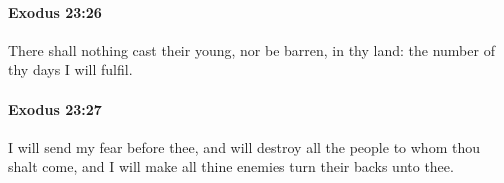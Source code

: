 		\paragraph{Exodus 23:26} %
			\label{EXODUS-23-26}

			There shall nothing cast their young, nor be barren, in thy land: the number of thy days I will fulfil.


		\paragraph{Exodus 23:27} %
			\label{EXODUS-23-27}

			I will send my fear before thee, and will destroy all the people to whom thou shalt come, and I will make all thine enemies turn their backs unto thee.


